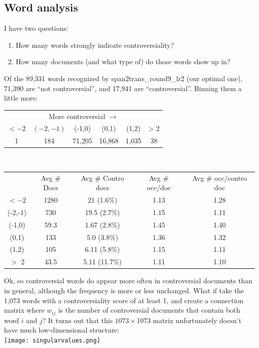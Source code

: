 \documentclass[11pt]{article} %
\begin{document}
\subsection{Word analysis}
I have two questions:
\begin{enumerate}
\item How many words strongly indicate controversiality?
\item How many documents (and what type of) do those words show up in?
\end{enumerate}
Of the 89,331 words recognized by span2trans\_round9\_lr2 (our optimal one), 71,390 are ``not controversial'', and 17,941 are ``controversial''. Binning them a little more: \\
\begin{tabular}{|*{6}{c|}}
\multicolumn{6}{|c|}{More controversial $\to$} \\
$< -2$ & $(-2,-1)$ & (-1,0) & (0,1) & (1,2) & > 2 \\
1 & 184 & 71,205 & 16,868 & 1,035 & 38 \end{tabular}
\\
\begin{tabular}{|*5{c|}}
& Avg \# Docs & Avg \# Contro docs & Avg \# occ/doc & Avg \# occ/contro doc \\
$<-2$ &  1280 & 21 (1.6\%) & 1.13 & 1.28 \\
(-2,-1) & 730 & 19.5 (2.7\%)& 1.15 & 1.11 \\
(-1,0) & 59.3 & 1.67 (2.8\%)& 1.45 & 1.40 \\
(0,1) & 133 & 5.0 (3.8\%)& 1.36 & 1.32 \\
(1,2) & 105 & 6.11 (5.8\%) & 1.15 & 1.11 \\
$>$ 2 & 43.5 & 5.11 (11.7\%)& 1.11 & 1.10 \end{tabular}

Ok, so controversial words do appear more often in controversial documents than in general, although the frequency is more or less unchanged. What if take the 1,073 words with a controversiality score of at least 1, and create a connection matrix where $w_{ij}$ is the number of controversial documents that contain both word $i$ and $j$? It turns out that this $1073\times1073$ matrix unfortunately doesn't have much low-dimensional structure:\\
\texttt{[image: singularvalues.png]}\\
\end{document}
